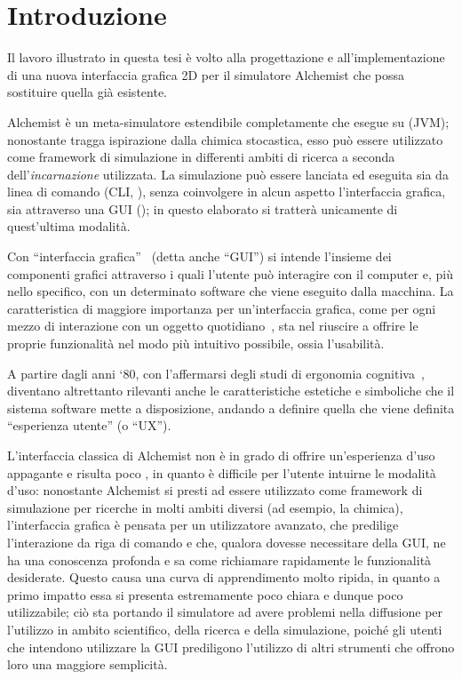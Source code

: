 
\chapter*{Introduzione}\label{ch:intro}
    Il lavoro illustrato in questa tesi è volto alla progettazione e all'implementazione di una nuova interfaccia grafica 2D per il simulatore Alchemist che possa sostituire quella già esistente.

    Alchemist è un meta-simulatore estendibile completamente  che esegue su  (JVM);
    nonostante tragga ispirazione dalla chimica stocastica, esso può essere utilizzato come framework di simulazione in differenti ambiti di ricerca a seconda dell'\emph{incarnazione} utilizzata.
    La simulazione può essere lanciata ed eseguita sia da linea di comando (CLI, ), senza coinvolgere in alcun aspetto l'interfaccia grafica, sia attraverso una GUI ();
    in questo elaborato si tratterà unicamente di quest'ultima modalità.

    Con ``interfaccia grafica''~\cite{gui} (detta anche ``GUI'') si intende l'insieme dei componenti grafici attraverso i quali l'utente può interagire con il computer e, più nello specifico, con un determinato software che viene eseguito dalla macchina.
    La caratteristica di maggiore importanza per un'interfaccia grafica, come per ogni mezzo di interazione con un oggetto quotidiano~\cite{norman1988}, sta nel riuscire a offrire le proprie funzionalità nel modo più intuitivo possibile, ossia l'usabilità.

    A partire dagli anni `80, con l'affermarsi degli studi di ergonomia cognitiva~\cite{cognitiveErgonomics}, diventano altrettanto rilevanti anche le caratteristiche estetiche e simboliche che il sistema software mette a disposizione, andando a definire quella che viene definita ``esperienza utente'' (o ``UX'').

    L'interfaccia classica di Alchemist non è in grado di offrire un'esperienza d'uso appagante e risulta poco , in quanto è difficile per l'utente intuirne le modalità d'uso:
    nonostante Alchemist si presti ad essere utilizzato come framework di simulazione per ricerche in molti ambiti diversi (ad esempio, la chimica), l'interfaccia grafica è pensata per un utilizzatore avanzato, che predilige l'interazione da riga di comando e che, qualora dovesse necessitare della GUI, ne ha una conoscenza profonda e sa come richiamare rapidamente le funzionalità desiderate.
    Questo causa una curva di apprendimento molto ripida, in quanto a primo impatto essa si presenta estremamente poco chiara e dunque poco utilizzabile;
    ciò sta portando il simulatore ad avere problemi nella diffusione per l'utilizzo in ambito scientifico, della ricerca e della simulazione, poiché gli utenti che intendono utilizzare la GUI prediligono l'utilizzo di altri strumenti che offrono loro una maggiore semplicità.

